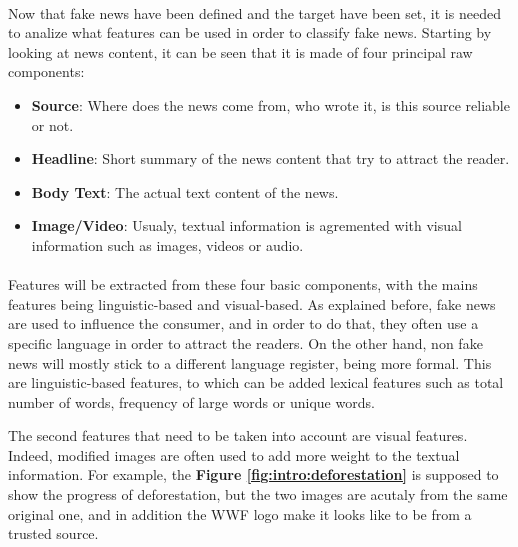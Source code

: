 \paragraph{} Now that fake news have been defined and the target have been set, it is needed to analize what features can be used in order to classify fake news. Starting by looking at news content, it can be seen that it is made of four principal raw components: 
\begin{itemize}
	\item \textbf{Source}: Where does the news come from, who wrote it, is this source reliable or not.
	\item \textbf{Headline}: Short summary of the news content that try to attract the reader.
	\item \textbf{Body Text}: The actual text content of the news.
	\item \textbf{Image/Video}: Usualy, textual information is agremented with visual information such as images, videos or audio.  
\end{itemize}

\paragraph{} Features will be extracted from these four basic components, with the mains features being linguistic-based and visual-based. 
As explained before, fake news are used to influence the consumer, and in order to do that, they often use a specific language in order to attract the readers. On the other hand, non fake news will mostly stick to a different language register, being more formal. This are linguistic-based features, to which can be added lexical features such as total number of words, frequency of large words or unique words. 

The second features that need to be taken into account are visual features. Indeed, modified images are often used to add more weight to the textual information. For example, the \textbf{Figure \ref{fig:intro:deforestation}} is supposed to show the progress of deforestation, but the two images are acutaly from the same original one, and in addition the WWF logo make it looks like to be from a trusted source. 

